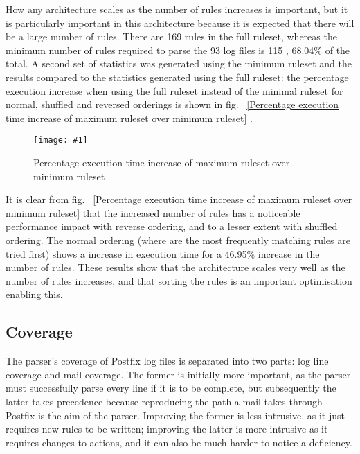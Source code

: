 \documentclass[draft]{svmult}
\newcommand{\showgraph}[3]{%
    \begin{figure}[hbt!]
        \caption{#2}\label{#3}
        \texttt{[image: \#1]}
    \end{figure}
}
\newcommand{\refwithpage}[1]{%
    \empty{}\vref{#1}%
}
\newcommand{\numberOFlogFILES}[0]{%
    93%
}
\newcommand{\numberOFrules}[0]{%
    169%
}
\newcommand{\numberOFrulesMINIMUM}[0]{%
    115%
}
\newcommand{\numberOFrulesMINIMUMpercentage}[0]{%
    68.04\%%
}
\newcommand{\numberOFrulesMAXIMUMpercentage}[0]{%
    46.95\%%
}
\begin{document}
How any architecture scales as the number of rules increases is important,
but it is particularly important in this architecture because it is
expected that there will be a large number of rules.  There are
\numberOFrules{} rules in the full ruleset, whereas the minimum number of
rules required to parse the \numberOFlogFILES{} log files is
\numberOFrulesMINIMUM{}, \numberOFrulesMINIMUMpercentage{} of the total.  A
second set of statistics was generated using the minimum ruleset and the
results compared to the statistics generated using the full ruleset: the
percentage execution increase when using the full ruleset instead of the
minimal ruleset for normal, shuffled and reversed orderings is shown in
fig.~\refwithpage{Percentage execution time increase of maximum ruleset
over minimum ruleset}.  \showgraph{build/plot-normal-vs-smaller}{Percentage
execution time increase of maximum ruleset over minimum ruleset}{Percentage
execution time increase of maximum ruleset over minimum ruleset}

It is clear from fig.~\refwithpage{Percentage execution time increase of
maximum ruleset over minimum ruleset} that the increased number of rules
has a noticeable performance impact with reverse ordering, and to a lesser
extent with shuffled ordering.  The normal ordering (where are the most
frequently matching rules are tried first) shows a
 increase in
execution time for a \numberOFrulesMAXIMUMpercentage{} increase in the
number of rules.  These results show that the architecture scales very well
as the number of rules increases, and that sorting the rules is an
important optimisation enabling this.

\subsection{Coverage}

\label{coverage}

The parser's coverage of Postfix log files is separated into two parts: log
line coverage and mail coverage.  The former is initially more important,
as the parser must successfully parse every line if it is to be complete,
but subsequently the latter takes precedence because reproducing the path a
mail takes through Postfix is the aim of the parser.  Improving the former
is less intrusive, as it just requires new rules to be written; improving
the latter is more intrusive as it requires changes to actions, and it can
also be much harder to notice a deficiency.
\end{document}
